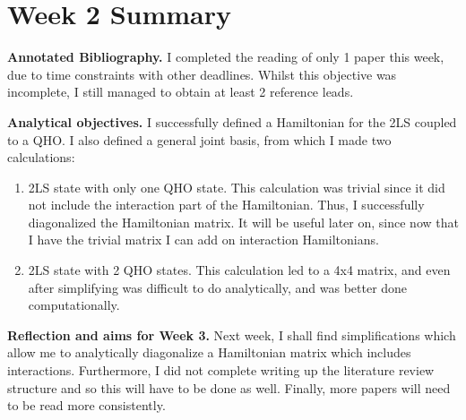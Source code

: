 \documentclass{article}
\begin{document}
\section*{Week 2 Summary}

\vspace{0.5cm}

\textbf{Annotated Bibliography.} I completed the reading of only 1 paper this week, due to time constraints with other deadlines. Whilst this objective was incomplete, I still managed to obtain at least 2 reference leads. 

\vspace{0.5cm}

\textbf{Analytical objectives.} I successfully defined a Hamiltonian for the 2LS coupled to a QHO. I also defined a general joint basis, from which I made two calculations:
\begin{enumerate}
    \item 2LS state with only one QHO state. This calculation was trivial since it did not include the interaction part of the Hamiltonian. Thus, I successfully diagonalized the Hamiltonian matrix. It will be useful later on, since now that I have the trivial matrix I can add on interaction Hamiltonians.
    \item 2LS state with 2 QHO states. This calculation led to a 4x4 matrix, and even after simplifying was difficult to do analytically, and was better done computationally.
\end{enumerate}

\textbf{Reflection and aims for Week 3.} Next week, I shall find simplifications which allow me to analytically diagonalize a Hamiltonian matrix which includes interactions. Furthermore, I did not complete writing up the literature review structure and so this will have to be done as well. Finally, more papers will need to be read more consistently. 
\end{document}
